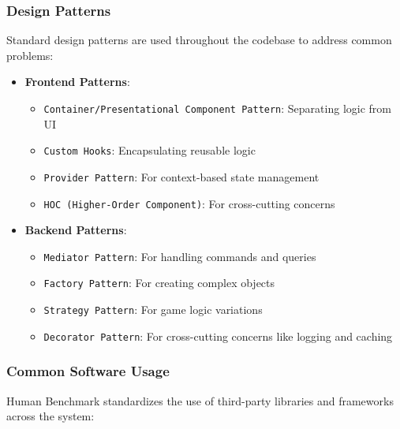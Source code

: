 \subsubsection{Design Patterns}

Standard design patterns are used throughout the codebase to address common problems:

\begin{itemize}
    \item \textbf{Frontend Patterns}:
    \begin{itemize}
        \item \texttt{Container/Presentational Component Pattern}: Separating logic from UI
        \item \texttt{Custom Hooks}: Encapsulating reusable logic
        \item \texttt{Provider Pattern}: For context-based state management
        \item \texttt{HOC (Higher-Order Component)}: For cross-cutting concerns
    \end{itemize}
    
    \item \textbf{Backend Patterns}:
    \begin{itemize}
        \item \texttt{Mediator Pattern}: For handling commands and queries
        \item \texttt{Factory Pattern}: For creating complex objects
        \item \texttt{Strategy Pattern}: For game logic variations
        \item \texttt{Decorator Pattern}: For cross-cutting concerns like logging and caching
    \end{itemize}
\end{itemize}

\subsubsection{Common Software Usage}

Human Benchmark standardizes the use of third-party libraries and frameworks across the system:

